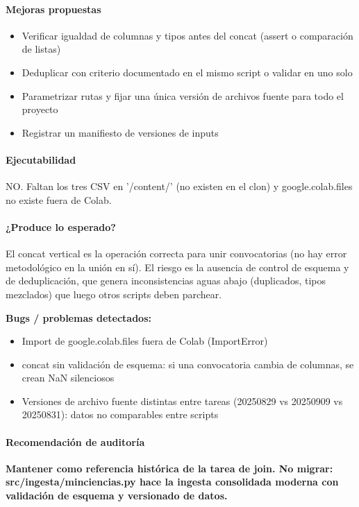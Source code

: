 \paragraph{Mejoras propuestas}
\begin{itemize}
  \item Verificar igualdad de columnas y tipos antes del concat (assert o comparación de listas)
  \item Deduplicar con criterio documentado en el mismo script o validar en uno solo
  \item Parametrizar rutas y fijar una única versión de archivos fuente para todo el proyecto
  \item Registrar un manifiesto de versiones de inputs
\end{itemize}

\paragraph{Ejecutabilidad}
NO. Faltan los tres CSV en '/content/' (no existen en el clon) y google.colab.files no existe fuera de Colab.

\paragraph{¿Produce lo esperado?}
El concat vertical es la operación correcta para unir convocatorias (no hay error metodológico en la unión en sí). El riesgo es la ausencia de control de esquema y de deduplicación, que genera inconsistencias aguas abajo (duplicados, tipos mezclados) que luego otros scripts deben parchear.

\begin{tcolorbox}[riesgo]
\textbf{Bugs / problemas detectados:}
\begin{itemize}
  \item Import de google.colab.files fuera de Colab (ImportError)
  \item concat sin validación de esquema: si una convocatoria cambia de columnas, se crean NaN silenciosos
  \item Versiones de archivo fuente distintas entre tareas (20250829 vs 20250909 vs 20250831): datos no comparables entre scripts
\end{itemize}
\end{tcolorbox}

\paragraph{Recomendación de auditoría}
\textbf{Mantener como referencia histórica de la tarea de join. No migrar: src/ingesta/minciencias.py hace la ingesta consolidada moderna con validación de esquema y versionado de datos.}

